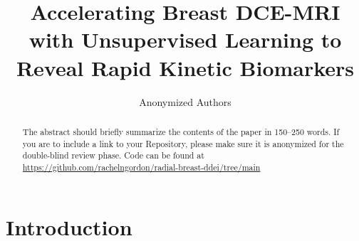 \documentclass[runningheads]{llncs}
\begin{document}
%
\title{Accelerating Breast DCE-MRI with Unsupervised Learning to Reveal Rapid Kinetic Biomarkers}
%

\author{Anonymized Authors}  %
  
\maketitle              %
%
\begin{abstract}
The abstract should briefly summarize the contents of the paper in 150--250 words.  If you are to include a link to your Repository, please make sure it is anonymized for the double-blind review phase.
Code can be found at \url{https://github.com/rachelngordon/radial-breast-ddei/tree/main}


\end{abstract}


\section{Introduction}
\end{document}
